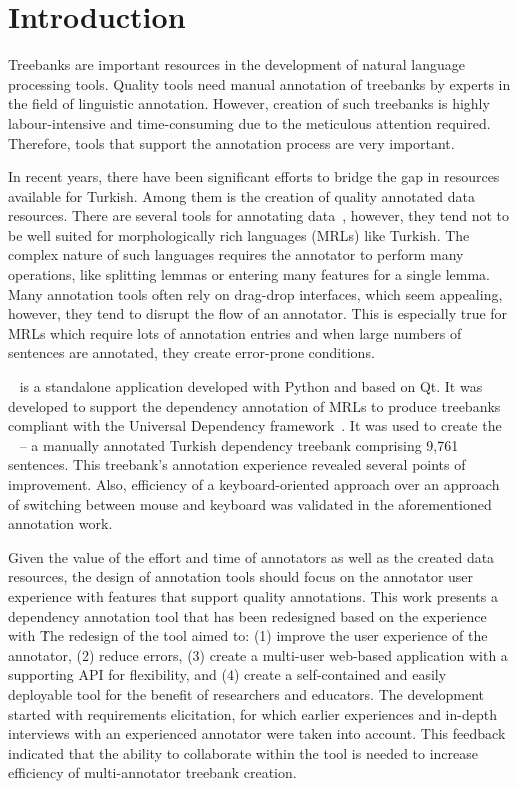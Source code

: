 \section{Introduction}
\label{sec:introduction}

Treebanks are important resources in the development of natural language processing tools.
Quality tools need manual annotation of treebanks by experts in the field of linguistic annotation.
However, creation of such treebanks is highly labour-intensive and time-consuming due to the meticulous attention required.
Therefore, tools that support the annotation process are very important.

In recent years, there have been significant efforts to bridge the gap in resources available for Turkish.
Among them is the creation of quality annotated data resources.
There are several tools for annotating data~\cite{brat,dgannotator}, however, they tend not to be well suited for morphologically rich languages (MRLs) like Turkish.
The complex nature of such languages requires the annotator to perform many operations, like splitting lemmas or entering many features for a single lemma.
Many annotation tools often rely on drag-drop interfaces, which seem appealing, however, they tend to disrupt the flow of an annotator.
This is especially true for MRLs which require lots of annotation entries and when large numbers of sentences are annotated, they create error-prone conditions. %

\boatvone~\cite{trk2020resources} is a standalone application developed with Python and based on Qt.
It was developed to support the dependency annotation of MRLs to produce treebanks compliant with the Universal Dependency framework~\cite{UD}.
It was used to create the \bountreebank~\cite{turk-etal-2019-turkish,trk2020resources,UD-Boun-Treebank} -- a manually annotated Turkish dependency treebank comprising 9,761 sentences.
This treebank's annotation experience revealed several points of improvement.
Also, efficiency of a keyboard-oriented approach over an approach of switching between mouse and keyboard was validated in the aforementioned annotation work.

Given the value of the effort and time of annotators as well as the created data resources, the design of annotation tools should focus on the annotator user experience with features that support quality annotations.
This work presents a dependency annotation tool that has been redesigned based on the experience with \boatvone\.
The redesign of the tool aimed to: (1) improve the user experience of the annotator, (2) reduce errors, (3) create a multi-user web-based application with a supporting API for flexibility, and (4) create a self-contained and easily deployable tool for the benefit of researchers and educators.
The development started with requirements elicitation, for which earlier experiences and in-depth interviews with an experienced annotator were taken into account.
This feedback indicated that the ability to collaborate within the tool is needed to increase efficiency of multi-annotator treebank creation.


